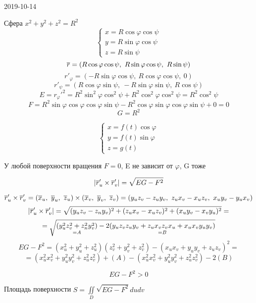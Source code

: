 \documentclass[main]{subfiles}
\begin{document}
\begin{lect} {2019-10-14}
	  \begin{example}
	    Сфера $x^2 + y^2 + z^2 = R^2$
	    \[\begin{cases}
	      x = R \cos\varphi \cos\psi\\
	      y = R \sin\varphi \cos\psi\\
	      z = R \sin\psi
	    \end{cases}\]
	    \[\overline{r} = (R \cos\varphi \cos\psi,\ R\sin\varphi \cos\psi,\ R \sin\psi)\]
	    \[r'_{\varphi} = (-R \sin\varphi \cos\psi,\ R\cos\varphi \cos\psi,\ 0)\]
	    \[r'_{\psi} = (R \cos\varphi \sin\psi,\ -R\sin\varphi \sin\psi,\ R \cos\psi)\]
	    \[E = r_{\varphi}'^2 = R^2 \sin^2 \varphi \cos^2 \psi + R^2 \cos^2 \varphi \cos^2 \psi = R^2 \cos^2 \psi\]
	    \[F = R^2 \sin\varphi \cos\varphi\cos\varphi\sin\psi - R^2 \cos\varphi \sin\varphi \cos\varphi \sin\psi + 0 = 0\]
	    \[G = R^2\]
	  \end{example}

	  \begin{example} 
	    \[\begin{cases}
	      x = f(t) \cos\varphi\\
	      y = f(t) \sin\varphi\\
	      z = g(t)
	    \end{cases}\]
	  \end{example}

	  \begin{upr}
	    У любой поверхности вращения $F=0$, E не зависит от $\varphi$, G тоже
	  \end{upr}

	  \begin{Theorem}
	    \[|\overline{r}'_u \times \overline{r}'_v| = \sqrt{EG-F^2}\]
	  \end{Theorem}

	  \begin{Proof}
	    \[\ol{r}_u' \times \ol{r}_v' = (\ol{x}_u,\ \ol{y}_u,\ \ol{z}_u) \times (\ol{x}_v,\ \ol{y}_v,\ \ol{z}_v) = (y_u z_v - z_u y_v,\ z_u x_v - x_u z_v,\ x_u y_v - y_u x_v)\]
	    \[|\overline{r}_u' \times \overline{r}_v'| = \sqrt{(y_u z_v - z_n y_v)^2 + (z_u x_v - x_u z_v)^2 + (x_u y_v - x_v y_u)^2} = \]
	    \[= \sqrt{\underset{=A}{(y_u^2 z_v^2 + z_n^2 y_v^2)} - 2 \underset{=B}{(y_u z_v z_u y_v + z_u x_v z_v x_u + x_u x_v y_u y_v)}}\]
	    \[EG-F^2 = (x_u^2 + y_u^2 + z_u^2)(z_v^2 + y_v^2 + z_v^2) - (x_u x_v + y_u y_v + z_u z_v)^2 =\]
	    \[= (x_u^2 x_v^2 + y_u^2 y_v^2 + z_u^2 z_v^2) + (A)-(x_u^2 x_v^2 + y_u^2 y_v^2 + z_u^2 z_v^2) - 2(B)\]
	  \end{Proof}

	  \begin{Consequence}
	    \[EG-F^2 > 0\]
	  \end{Consequence}

	  \begin{theorem}
	    Площадь поверхности $S = \iint\limits_D \sqrt{EG - F^2} du dv$
	  \end{theorem}
	\end{lect}
\end{document}
